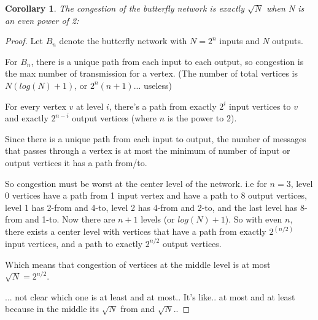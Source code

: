 \documentclass[10pt]{article}
\newtheorem{corollary}[theorem]{Corollary}
\begin{document}
\begin{corollary}The congestion of the butterfly network is exactly
  $\sqrt{N}$ when N is an even power of 2:
\end{corollary}
\begin{proof}
Let $B_n$ denote the butterfly network with $N=2^n$ inputs and $N$ outputs.

For $B_n$, there is a unique path from each input to each output,
so congestion is the max number of transmission for a vertex.
(The number of total vertices is $N(log(N)+1)$, or $2^n(n+1)$... useless)

For every vertex $v$ at level $i$, there's a path from exactly $2^i$
input vertices to $v$ and exactly $2^{n-i}$ output vertices (where $n$
is the power to 2).


Since there is a unique path from each input to output,  the number of
messages that passes through a vertex is at most the minimum of number
of input or output vertices it has a path from/to. 
 
So congestion must be worst at the center level of the
network. i.e for $n=3$, level 0 vertices have a path from 1 input
vertex and have a path to 8 output vertices, level 1 has 2-from and
4-to, level 2 has 4-from and 2-to, and the last level has 8-from and
1-to. Now there are $n+1$ levels (or $log(N)+1$). So with even $n$,
there exists a center level with vertices that have a path from exactly $2^{(n/2)}$
input vertices, and a path to exactly $2^{n/2}$ output vertices.

Which means that congestion of vertices at the middle level is at most
$\sqrt{N} = 2^{n/2}$. 

... not clear which one is at least and at most.. It's like.. at most
and at least because in the middle its $\sqrt{N}$ from and $\sqrt{N}$..


  \end{proof}
\end{document}
